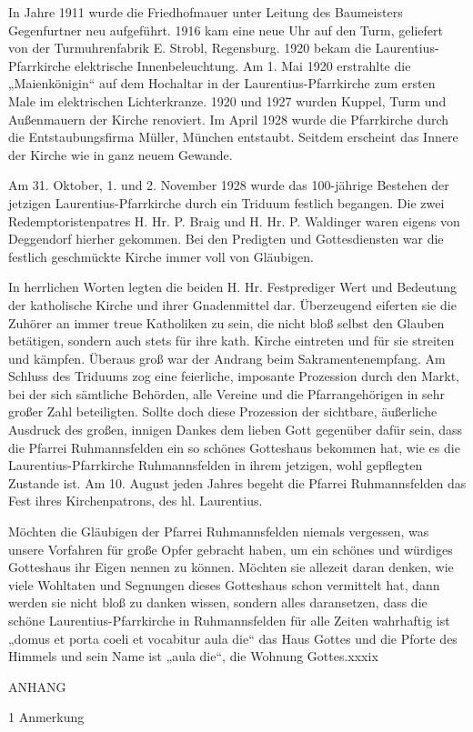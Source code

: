 \documentclass[12pt,a4paper]{book}
\begin{document}
In Jahre 1911 wurde die Friedhofmauer unter Leitung des Baumeisters Gegenfurtner
neu aufgeführt. 1916 kam eine neue Uhr auf den Turm, geliefert von der
Turmuhrenfabrik E. Strobl, Regensburg. 1920 bekam die Laurentius-Pfarrkirche
elektrische Innenbeleuchtung. Am 1. Mai 1920 erstrahlte die „Maienkönigin“ auf
dem Hochaltar in der Laurentius-Pfarrkirche zum ersten Male im elektrischen
Lichterkranze. 1920 und 1927 wurden Kuppel, Turm und Außenmauern der Kirche
renoviert. Im April 1928 wurde die Pfarrkirche durch die Entstaubungsfirma
Müller, München entstaubt. Seitdem erscheint das Innere der Kirche wie in ganz
neuem Gewande.

Am 31. Oktober, 1. und 2. November 1928 wurde das 100-jährige Bestehen der
jetzigen Laurentius-Pfarrkirche durch ein Triduum festlich begangen. Die zwei
Redemptoristenpatres H. Hr. P. Braig und H. Hr. P. Waldinger waren eigens von
Deggendorf hierher gekommen. Bei den Predigten und Gottesdiensten war die
festlich geschmückte Kirche immer voll von Gläubigen.

In herrlichen Worten legten die beiden H. Hr. Festprediger Wert und Bedeutung
der katholische Kirche und ihrer Gnadenmittel dar. Überzeugend eiferten sie die
Zuhörer an immer treue Katholiken zu sein, die nicht bloß selbst den Glauben
betätigen, sondern auch stets für ihre kath. Kirche eintreten und für sie
streiten und kämpfen. Überaus groß war der Andrang beim Sakramentenempfang. Am
Schluss des Triduums zog eine feierliche, imposante Prozession durch den Markt,
bei der sich sämtliche Behörden, alle Vereine und die Pfarrangehörigen in sehr
großer Zahl beteiligten. Sollte doch diese Prozession der sichtbare, äußerliche
Ausdruck des großen, innigen Dankes dem lieben Gott gegenüber dafür sein, dass
die Pfarrei Ruhmannsfelden ein so schönes Gotteshaus bekommen hat, wie es die
Laurentius-Pfarrkirche Ruhmannsfelden in ihrem jetzigen, wohl gepflegten
Zustande ist. Am 10. August jeden Jahres begeht die Pfarrei Ruhmannsfelden das
Fest ihres Kirchenpatrons, des hl. Laurentius.

Möchten die Gläubigen der Pfarrei Ruhmannsfelden niemals vergessen, was unsere
Vorfahren für große Opfer gebracht haben, um ein schönes und würdiges Gotteshaus
ihr Eigen nennen zu können. Möchten sie allezeit daran denken, wie viele
Wohltaten und Segnungen dieses Gotteshaus schon vermittelt hat, dann werden sie
nicht bloß zu danken wissen, sondern alles daransetzen, dass die schöne
Laurentius-Pfarrkirche in Ruhmannsfelden für alle Zeiten wahrhaftig ist „domus
et porta coeli et vocabitur aula die“ das Haus Gottes und die Pforte des Himmels
und sein Name ist „aula die“, die Wohnung Gottes.xxxix

ANHANG

1 Anmerkung
\end{document}
